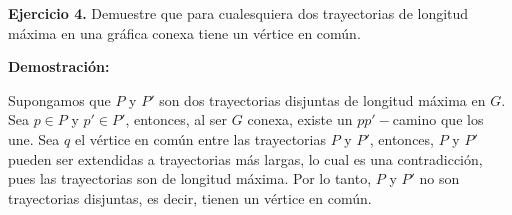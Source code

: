 \textbf{Ejercicio 4.} Demuestre que para cualesquiera dos trayectorias de longitud
máxima en una gráfica conexa tiene un vértice en común.

\textbf{Demostración:}

Supongamos que $P$ y $P'$ son dos trayectorias disjuntas de 
longitud máxima en $G$. Sea $p\in P$ y $p'\in P'$, entonces, al ser $G$ conexa, existe 
un $pp'-$camino que los une. Sea $q$ el vértice en común entre las trayectorias $P$ y $P'$, 
entonces, $P$ y $P'$ pueden ser extendidas a trayectorias más largas, lo cual es una contradicción, 
pues las trayectorias son de longitud máxima. Por lo tanto, $P$ y $P'$ no son trayectorias disjuntas, 
es decir, tienen un vértice en común.  

\QED

\newpage